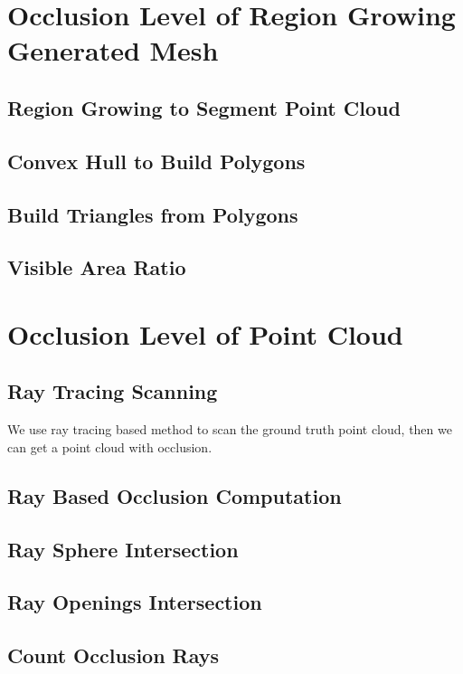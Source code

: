 \documentclass[11pt, a4paper,oneside,chapterprefix=false]{scrbook}
\begin{document}
\section{Occlusion Level of Region Growing Generated Mesh}

\subsection{Region Growing to Segment Point Cloud}

\subsection{Convex Hull to Build Polygons}

\subsection{Build Triangles from Polygons}

\subsection{Visible Area Ratio}

\section{Occlusion Level of Point Cloud}

\subsection{Ray Tracing Scanning}

We use ray tracing based method to scan the ground truth point cloud, then we can get a point cloud with occlusion.

\subsection{Ray Based Occlusion Computation}

\subsection{Ray Sphere Intersection}

\subsection{Ray Openings Intersection}

\subsection{Count Occlusion Rays}
\end{document}
